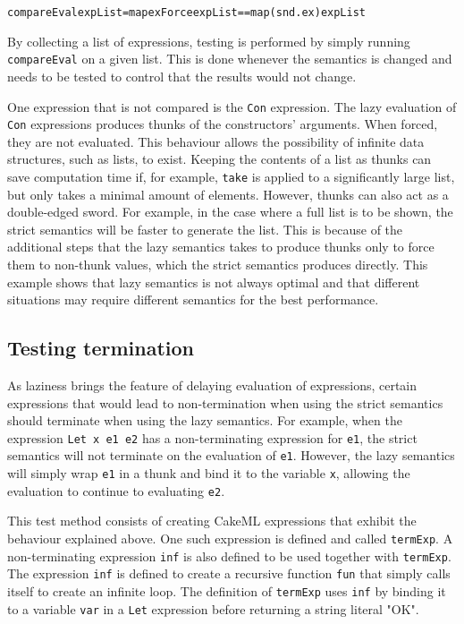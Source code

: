 \begin{alltt}
  compareEval expList = map exForce expList == map (snd . ex) expList
\end{alltt}

By collecting a list of expressions, testing is performed by simply running
\texttt{compareEval} on a given list. This is done whenever the semantics is
changed and needs to be tested to control that the results would not change.

One expression that is not compared is the \texttt{Con} expression. The lazy
evaluation of \texttt{Con} expressions produces thunks of the constructors'
arguments. When forced, they are not evaluated. This behaviour allows the
possibility of infinite data structures, such as lists, to exist.
Keeping the contents of a list as thunks can save computation time if,
for example, \texttt{take} is applied to a significantly large list, but only
takes a minimal amount of elements. However, thunks can also
act as a double-edged sword. For example, in the case where a full list is to be
shown, the strict semantics will be faster to generate the list. This is because
of the additional steps that the lazy semantics takes to produce thunks only to
force them to non-thunk values, which the strict semantics produces directly.
This example shows that lazy semantics is not always optimal and that different
situations may require different semantics for the best performance.

\subsection{Testing termination}
As laziness brings the feature of delaying evaluation of expressions, certain
expressions that would lead to non-termination when using the strict semantics
should terminate when using the lazy semantics. For example, when the expression
\texttt{Let x e1 e2} has a non-terminating expression for \texttt{e1}, the
strict semantics will not terminate on the evaluation of \texttt{e1}. However,
the lazy semantics will simply wrap \texttt{e1} in a thunk and bind it to the
variable \texttt{x}, allowing the evaluation to continue to evaluating
\texttt{e2}.

This test method consists of creating CakeML expressions that exhibit the
behaviour explained above. One such expression is defined
and called \texttt{termExp}. A non-terminating expression \texttt{inf} is also
defined to be used together with \texttt{termExp}.
The expression
\texttt{inf} is defined to create a recursive function \texttt{fun}
that simply calls itself to create an infinite loop.
The definition of \texttt{termExp} uses
\texttt{inf} by binding it to a variable \texttt{var} in a \texttt{Let}
expression before returning a string literal "OK".

